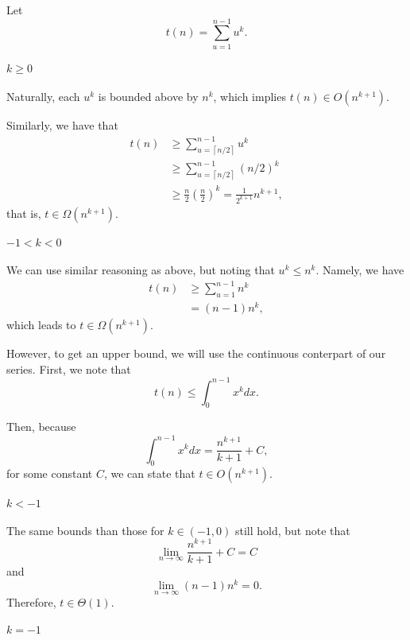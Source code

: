  

Let \[
t(n) = \sum_{u=1}^{n-1} u^{k}
.\] 

\paragraph{$k\ge 0$}

Naturally, each $u^{k}$ is bounded above by $n^{k}$, which implies $t(n) \in  O(n^{k+1})$.

Similarly, we have that
\begin{align*}
    t(n) &\ge \sum_{u=\left\lceil n / 2 \right\rceil }^{n-1} u^{k}  \\
    &\ge \sum_{u=\left\lceil n / 2 \right\rceil }^{n-1} (n / 2)^{k}  \\
    &\ge \frac{n}{2} \left( \frac{n}{2} \right)^{k} = \frac{1}{2^{k+1}} n^{k+1}
,\end{align*}
that is, $t \in \Omega(n^{k+1})$.

\paragraph{$-1 < k < 0$ }

We can use similar reasoning as above, but noting that $u^{k} \le n^{k}$.
Namely, we have
\begin{align*}
    t(n) &\ge \sum_{u=1}^{n-1} n^{k} \\
    &= (n-1)n^{k}
,\end{align*}
which leads to $t \in \Omega(n^{k+1})$.

However, to get an upper bound, we will use the continuous conterpart of our series.
First, we note that \[
    t(n) \le \int_0^{n-1} x^{k} dx
.\] 

Then, because \[
    \int_0^{n-1} x^{k} dx = \frac{n^{k+1}}{k+1} + C
,\] for some constant $C$, we can state that $t \in O(n^{k+1})$.

\paragraph{$k< -1$}

The same bounds than those for $k \in \left( -1,0 \right) $ still hold, but note that \[
\lim_{n \to \infty} \frac{n^{k+1}}{k+1} + C = C
\] and \[
\lim_{n \to \infty} (n-1)n^{k} = 0
.\] 
Therefore, $t\in \Theta(1)$.

\paragraph{$k=-1$}

